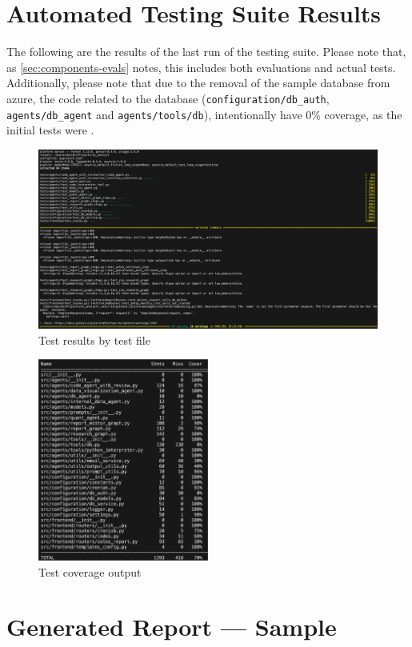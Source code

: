 \documentclass[a4paper]{report}
\begin{document}
\chapter{Automated Testing Suite Results}
\label{annex:test-results}

The following are the results of the last run of the testing suite. Please note that, as \autoref{sec:components-evals} notes, this includes both evaluations and actual tests. Additionally, please note that due to the removal of the sample database from azure, the code related to the database (\texttt{configuration/db\_auth}, \texttt{agents/db\_agent} and \texttt{agents/tools/db}), intentionally have 0\% coverage, as the initial tests were .

\begin{figure}[H]
\centering
\includegraphics[width=1\textwidth]{images/test-results.png}
\caption{Test results by test file}
\end{figure}

\begin{figure}[H]
\centering
\includegraphics[width=0.5\textwidth]{images/test-coverage.png}
\caption{Test coverage output}
\end{figure}

\chapter{Generated Report --- Sample}
\end{document}

